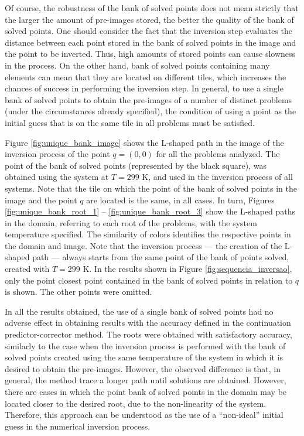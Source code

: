 \documentclass[journal=iecred,manuscript=article]{achemso}
\theoremstyle{definition}
\theoremstyle{remark}
\begin{document}
Of course, the robustness of the bank of solved points does not mean strictly that the larger the amount of pre-images stored, the better the quality of the bank of solved points. One should consider the fact that the inversion step evaluates the distance between each point stored in the bank of solved points in the image and the point to be inverted. Thus, high amounts of stored points can cause slowness in the process. On the other hand, bank of solved points containing many elements can mean that they are located on different tiles, which increases the chances of success in performing the inversion step. In general, to use a single bank of solved points to obtain the pre-images of a number of distinct problems (under the circumstances already specified), the condition of using a point as the initial guess that is on the same tile in all problems must be satisfied.

Figure \ref{fig:unique_bank_image} shows the L-shaped path in the image of the inversion process of the point $ q = \left(0,0\right) $ for all the problems analyzed. The point of the bank of solved points (represented by the black square), was obtained using the system at $ T = 299 $ K, and used in the inversion process of all systems. Note that the tile on which the point of the bank of solved points in the image and the point $ q $ are located is the same, in all cases. In turn, Figures \ref{fig:unique_bank_root_1} -- \ref{fig:unique_bank_root_3} show the L-shaped paths in the domain, referring to each root of the problems, with the system temperature specified. The similarity of colors identifies the respective points in the domain and image. Note that the inversion process --- the creation of the L-shaped path --- always starts from the same point of the bank of points solved, created with $ T = 299 $ K. In the results shown in Figure \ref{fig:sequencia_inversao}, only the point closest point contained in the bank of solved points in relation to $ q $ is shown. The other points were omitted.

In all the results obtained, the use of a single bank of solved points had no adverse effect in obtaining results with the accuracy defined in the continuation predictor-corrector method. The roots were obtained with satisfactory accuracy, similarly to the case when the inversion process is performed with the bank of solved points created using the same temperature of the system in which it is desired to obtain the pre-images. However, the observed difference is that, in general, the method trace a longer path until solutions are obtained. However, there are cases in which the point bank of solved points in the domain may be located closer to the desired root, due to the non-linearity of the system. Therefore, this approach can be understood as the use of a \enquote{non-ideal} initial guess in the numerical inversion process.
\end{document}
